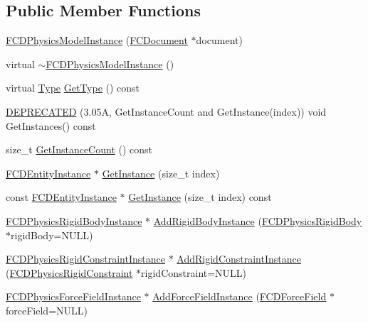 \subsection*{Public Member Functions}
\begin{DoxyCompactItemize}
\item 
\hyperlink{classFCDPhysicsModelInstance_a8beb946a1fd493c742eb4847c7225b80}{FCDPhysicsModelInstance} (\hyperlink{classFCDocument}{FCDocument} $\ast$document)
\item 
virtual \hyperlink{classFCDPhysicsModelInstance_ae5c49ecb35c2f09d1c542f8df89ab0c4}{$\sim$FCDPhysicsModelInstance} ()
\item 
virtual \hyperlink{classFCDEntityInstance_a82e95eec7d9242bbedb336b0d35b59d3}{Type} \hyperlink{classFCDPhysicsModelInstance_a84476954bc4c90e663bf775db097b9fb}{GetType} () const 
\item 
\hyperlink{classFCDPhysicsModelInstance_a7b673f1eef1db2ae557052facff5a525}{DEPRECATED} (3.05A, GetInstanceCount and GetInstance(index)) void GetInstances() const 
\item 
size\_\-t \hyperlink{classFCDPhysicsModelInstance_a078fb9b47516651b4cf766cb26142f93}{GetInstanceCount} () const 
\item 
\hyperlink{classFCDEntityInstance}{FCDEntityInstance} $\ast$ \hyperlink{classFCDPhysicsModelInstance_af26a56bbfe0e7bd5caa8261b41ba10e6}{GetInstance} (size\_\-t index)
\item 
const \hyperlink{classFCDEntityInstance}{FCDEntityInstance} $\ast$ \hyperlink{classFCDPhysicsModelInstance_a6a999aab87642a3ea8753316d9789986}{GetInstance} (size\_\-t index) const 
\item 
\hyperlink{classFCDPhysicsRigidBodyInstance}{FCDPhysicsRigidBodyInstance} $\ast$ \hyperlink{classFCDPhysicsModelInstance_a47ed41df54b61aee0ae2b5ed78717786}{AddRigidBodyInstance} (\hyperlink{classFCDPhysicsRigidBody}{FCDPhysicsRigidBody} $\ast$rigidBody=NULL)
\item 
\hyperlink{classFCDPhysicsRigidConstraintInstance}{FCDPhysicsRigidConstraintInstance} $\ast$ \hyperlink{classFCDPhysicsModelInstance_a6d720a4d9bc51e8ceb21fd0d2ea23a70}{AddRigidConstraintInstance} (\hyperlink{classFCDPhysicsRigidConstraint}{FCDPhysicsRigidConstraint} $\ast$rigidConstraint=NULL)
\item 
\hyperlink{classFCDPhysicsForceFieldInstance}{FCDPhysicsForceFieldInstance} $\ast$ \hyperlink{classFCDPhysicsModelInstance_a626669f91d2baa2919ade7bdd469c15b}{AddForceFieldInstance} (\hyperlink{classFCDForceField}{FCDForceField} $\ast$forceField=NULL)

\end{DoxyCompactItemize}
